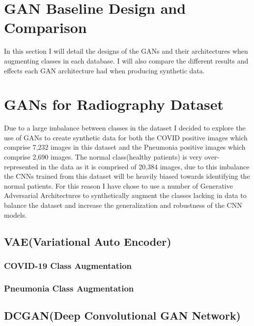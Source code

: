 \section{GAN Baseline Design and Comparison}
In this section I will detail the designs of the GANs and their architectures when augmenting classes in each database.  I will also compare the different results and effects each GAN architecture had when producing synthetic data.
\section{GANs for Radiography Dataset}
Due to a large imbalance between classes in the dataset I decided to explore the use of GANs to create synthetic data for both the COVID positive images which comprise 7,232 images in this dataset and the Pneumonia positive images which comprise 2,690 images.  The normal class(healthy patients) is very over-represented in the data as it is comprised of 20,384 images, due to this imbalance the CNNs trained from this dataset will be heavily biased towards identifying the normal patients.  For this reason I have chose to use a number of Generative Adversarial Architectures to synthetically augment the classes lacking in data to balance the dataset and increase the generalization and robustness of the CNN models.
\subsection{VAE(Variational Auto Encoder)}
\subsubsection{COVID-19 Class Augmentation}
\subsubsection{Pneumonia Class Augmentation}

\subsection{DCGAN(Deep Convolutional GAN Network)}
